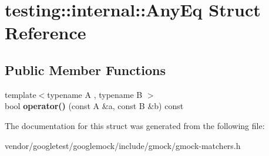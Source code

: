 \hypertarget{structtesting_1_1internal_1_1_any_eq}{}\section{testing\+:\+:internal\+:\+:Any\+Eq Struct Reference}
\label{structtesting_1_1internal_1_1_any_eq}
\subsection*{Public Member Functions}
\begin{DoxyCompactItemize}
\item 
\mbox{\label{structtesting_1_1internal_1_1_any_eq_ad5dc8fa819c5fb541181bdc61fdccbe0}} 
{\footnotesize template$<$typename A , typename B $>$ }\\bool {\bfseries operator()} (const A \&a, const B \&b) const
\end{DoxyCompactItemize}


The documentation for this struct was generated from the following file\+:\begin{DoxyCompactItemize}
\item 
vendor/googletest/googlemock/include/gmock/gmock-\/matchers.\+h\end{DoxyCompactItemize}
